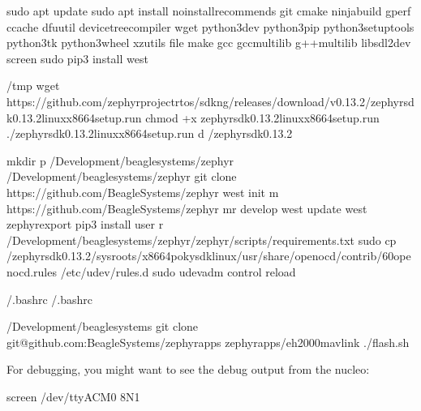 \documentclass[letterpaper,10pt,english]{sphinxmanual}
\begin{document}
\begin{sphinxVerbatim}[commandchars=\\\{\}]
sudo apt update
sudo apt install \PYGZhy{}\PYGZhy{}no\PYGZhy{}install\PYGZhy{}recommends git cmake ninja\PYGZhy{}build gperf   ccache dfu\PYGZhy{}util device\PYGZhy{}tree\PYGZhy{}compiler wget   python3\PYGZhy{}dev python3\PYGZhy{}pip python3\PYGZhy{}setuptools python3\PYGZhy{}tk python3\PYGZhy{}wheel xz\PYGZhy{}utils file   make gcc gcc\PYGZhy{}multilib g++\PYGZhy{}multilib libsdl2\PYGZhy{}dev screen
sudo pip3 install west

 /tmp
wget https://github.com/zephyrproject\PYGZhy{}rtos/sdk\PYGZhy{}ng/releases/download/v0.13.2/zephyr\PYGZhy{}sdk\PYGZhy{}0.13.2\PYGZhy{}linux\PYGZhy{}x86\PYGZus{}64\PYGZhy{}setup.run
chmod +x zephyr\PYGZhy{}sdk\PYGZhy{}0.13.2\PYGZhy{}linux\PYGZhy{}x86\PYGZus{}64\PYGZhy{}setup.run
./zephyr\PYGZhy{}sdk\PYGZhy{}0.13.2\PYGZhy{}linux\PYGZhy{}x86\PYGZus{}64\PYGZhy{}setup.run \PYGZhy{}\PYGZhy{} \PYGZhy{}d \PYGZti{}/zephyr\PYGZhy{}sdk\PYGZhy{}0.13.2

mkdir \PYGZhy{}p \PYGZti{}/Development/beaglesystems/zephyr
 \PYGZti{}/Development/beaglesystems/zephyr
git clone https://github.com/BeagleSystems/zephyr
west init \PYGZhy{}m https://github.com/BeagleSystems/zephyr \PYGZhy{}\PYGZhy{}mr develop
west update
west zephyr\PYGZhy{}export
pip3 install \PYGZhy{}\PYGZhy{}user \PYGZhy{}r \PYGZti{}/Development/beaglesystems/zephyr/zephyr/scripts/requirements.txt
sudo cp \PYGZti{}/zephyr\PYGZhy{}sdk\PYGZhy{}0.13.2/sysroots/x86\PYGZus{}64\PYGZhy{}pokysdk\PYGZhy{}linux/usr/share/openocd/contrib/60\PYGZhy{}openocd.rules /etc/udev/rules.d
sudo udevadm control \PYGZhy{}\PYGZhy{}reload

  \PYGZgt{}\PYGZgt{} \PYGZti{}/.bashrc
 \PYGZti{}/.bashrc

 \PYGZti{}/Development/beaglesystems
git clone git@github.com:BeagleSystems/zephyr\PYGZus{}apps
 zephyr\PYGZus{}apps/eh2000\PYGZus{}mavlink
./flash.sh
\end{sphinxVerbatim}

For debugging, you might want to see the debug output from the nucleo:

\begin{sphinxVerbatim}[commandchars=\\\{\}]
screen /dev/ttyACM0  8N1
\end{sphinxVerbatim}
\end{document}
